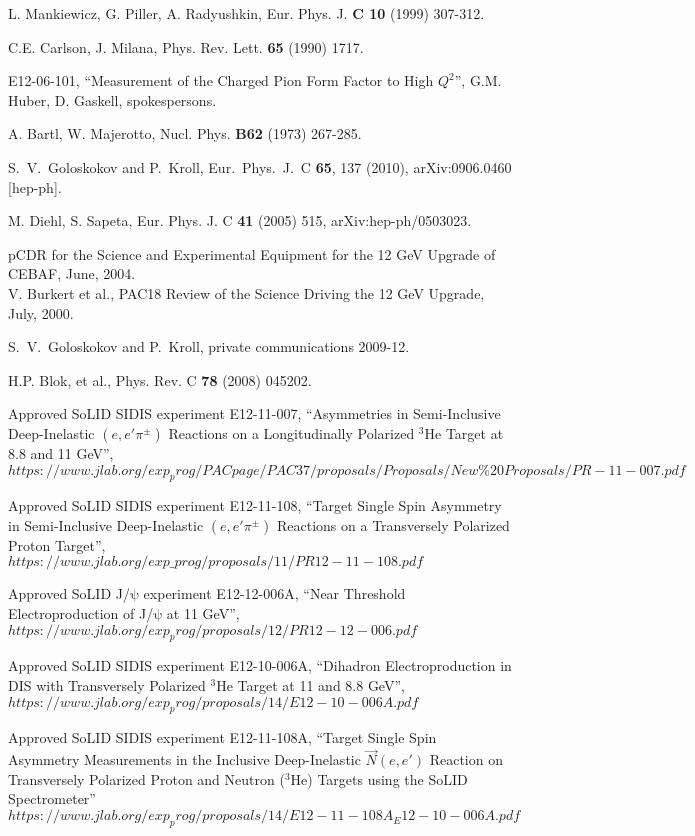 \begin{thebibliography}{}
 L. Mankiewicz, G. Piller, A. Radyushkin, Eur. Phys. J. {\bf C
    10} (1999) 307-312.

 C.E. Carlson, J. Milana, Phys. Rev. Lett. {\bf 65} (1990) 1717.

 E12-06-101, ``Measurement of the Charged Pion Form Factor to
  High $Q^2$'', G.M. Huber, D. Gaskell, spokespersons.

 A. Bartl, W. Majerotto, Nucl. Phys. {\bf B62} (1973) 267-285.

 S.~V.~Goloskokov and P.~Kroll, Eur.\ Phys.\ J.\ C {\bf 65},
  137 (2010), arXiv:0906.0460 [hep-ph].

 M. Diehl, S. Sapeta, Eur. Phys. J. C {\bf 41} (2005) 515,
  arXiv:hep-ph/0503023.

 pCDR for the Science and Experimental Equipment for the 12 GeV
  Upgrade of CEBAF, June, 2004.\\
V. Burkert et al., PAC18 Review of the Science Driving the 12 GeV Upgrade, 
  July, 2000.

 S.~V.~Goloskokov and P.~Kroll, private communications 2009-12.

 H.P. Blok, et al., Phys. Rev. C {\bf 78} (2008) 045202.

  Approved SoLID SIDIS experiment E12-11-007,
``Asymmetries in Semi-Inclusive Deep-Inelastic  $(e,e'\pi^{\pm})$ Reactions on a
Longitudinally Polarized $\mathrm{^{3}He}$ Target at 8.8 and 11 GeV'',
$https://www.jlab.org/exp_prog/PACpage/PAC37/proposals/Proposals/New\%20Proposals/PR-11-007.pdf$

  Approved SoLID SIDIS experiment E12-11-108,
``Target Single Spin Asymmetry in Semi-Inclusive Deep-Inelastic
$(e,e'\pi^{\pm})$ Reactions on a Transversely Polarized Proton Target'',
$https://www.jlab.org/exp\_prog/proposals/11/PR12-11-108.pdf$

  Approved SoLID J/$\mathrm{\psi}$ experiment E12-12-006A,
  ``Near Threshold Electroproduction of J/$\mathrm{\psi}$ at 11 GeV'',
$https://www.jlab.org/exp_prog/proposals/12/PR12-12-006.pdf$

  Approved SoLID SIDIS experiment E12-10-006A,
  ``Dihadron Electroproduction in DIS with  Transversely Polarized
  $\mathrm{^{3}He}$ Target at 11 and 8.8 GeV'',
$https://www.jlab.org/exp_prog/proposals/14/E12-10-006A.pdf$

   Approved SoLID SIDIS experiment E12-11-108A,
``Target Single Spin Asymmetry Measurements in the Inclusive Deep-Inelastic
$\vec{N}(e,e')$ Reaction on Transversely Polarized Proton and Neutron
($\mathrm{^{3}He}$) Targets using the SoLID Spectrometer''
$https://www.jlab.org/exp_prog/proposals/14/E12-11-108A_E12-10-006A.pdf$


\end{thebibliography}
